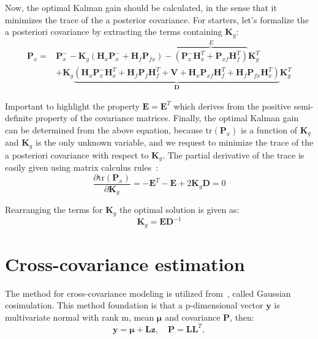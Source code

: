 Now, the optimal Kalman gain should be calculated, in the sense that it minimizes the trace of the a posterior covariance. For starters, let's formalize the a posteriori covariance by extracting the terms containing $\mathbf{K}_g$:
\begin{equation}
\begin{aligned}
    \mathbf{P}_x =& \mathbf{P}_x^--\mathbf{K}_g\left(\mathbf{H}_{x}\mathbf{P}_{x}^-+\mathbf{H}_{f}\mathbf{P}_{fx}\right) -
    \overbrace{\left(\mathbf{P}_{x}^-\mathbf{H}_{x}^T + \mathbf{P}_{xf}\mathbf{H}_{f}^T\right)}^{E}\mathbf{K}_g^T \\ & +
    \mathbf{K}_g\underbrace{\left(\mathbf{H}_{x}\mathbf{P}_{x}^-\mathbf{H}_{x}^T +\mathbf{H}_{f}\mathbf{P}_f\mathbf{H}_{f}^T+\mathbf{V} + \mathbf{H}_{x}\mathbf{P}_{xf}\mathbf{H}_f^T+\mathbf{H}_{f}\mathbf{P}_{fx}\mathbf{H}_x^T\right)}_{\mathbf{D}}\mathbf{K}_g^T
\end{aligned}
\end{equation}

Important to highlight the property $\mathbf{E}=\mathbf{E}^T$ which derives from the positive semi-definite property of the covariance matrices. Finally, the optimal Kalman gain can be determined from the above equation, because $\mathrm{tr}(\mathbf{P}_x)$ is a function of $\mathbf{K}_g$ and $\mathbf{K}_g$ is the only unknown variable, and we request to minimize the trace of the a posteriori covariance with respect to $\mathbf{K}_g$. The partial derivative of the trace is easily given using matrix calculus rules~\cite{matrix-calculus}:
\begin{equation}
    \frac{\partial \mathrm{tr}(\mathbf{P}_{x})}{\partial\mathbf{K}_g} = -\mathbf{E}^T-\mathbf{E}+2\mathbf{K}_g\mathbf{D} = 0
\end{equation}

Rearranging the terms for $\mathbf{K}_g$ the optimal solution is given as:
\begin{equation}
    \mathbf{K}_g=\mathbf{E}\mathbf{D}^{-1}
\label{eq:optimal-kalman-gain}
\end{equation}

\section{Cross-covariance estimation}

The method for cross-covariance modeling is utilized from~\cite{oliver2003gaussian}, called Gaussian cosimulation. This method foundation is that a p-dimensional vector $\mathbf{y}$ is multivariate normal with rank m, mean $\boldsymbol{\mu}$ and covariance $\mathbf{P}$, then:
\begin{equation}
    \mathbf{y}=\boldsymbol{\mu} + \mathbf{L}\mathbf{z}, \quad \mathbf{P}=\mathbf{L}\mathbf{L}^T,
\end{equation}

